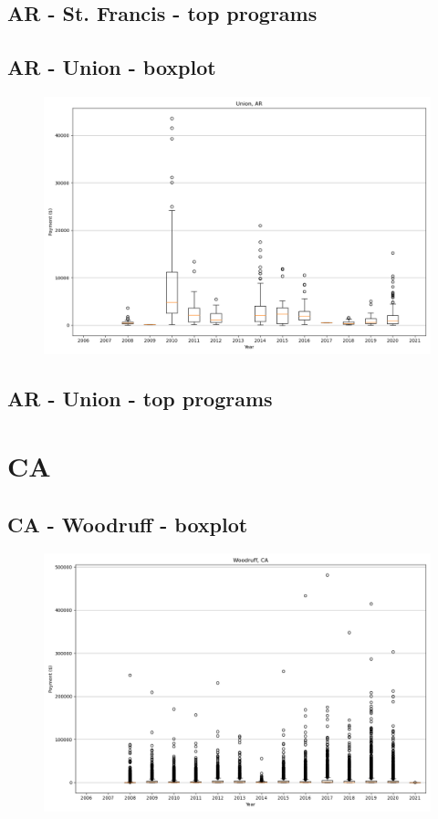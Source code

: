 \subsection*{AR - St. Francis - top programs}

\newpage
\subsection*{AR - Union - boxplot}
\begin{figure}[h]
\centering
\includegraphics[width=7in]{../output/boxplots/counties/Union-AR_boxplot.png}
\end{figure}


\subsection*{AR - Union - top programs}

\newpage
\section*{CA}
\subsection*{CA - Woodruff - boxplot}
\begin{figure}[h]
\centering
\includegraphics[width=7in]{../output/boxplots/counties/Woodruff-CA_boxplot.png}
\end{figure}



